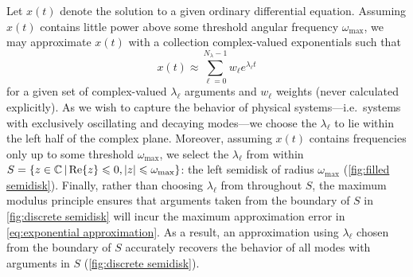 Let $x(t)$ denote the solution to a given ordinary differential equation.
Assuming $x(t)$ contains little power above some threshold angular frequency $\omega_\text{max}$, we may approximate $x(t)$ with a collection complex-valued exponentials such that
\begin{equation}
  x(t) \approx \sum_{\ell = 0}^{N_\lambda - 1} w_\ell e^{\lambda_\ell t}
  \label{eq:exponential approximation}
\end{equation}
for a given set of complex-valued $\lambda_\ell$ arguments and $w_\ell$ weights (never calculated explicitly).
As we wish to capture the behavior of physical systems---i.e.\ systems with exclusively oscillating and decaying modes---we choose the $\lambda_\ell$ to lie within the left half of the complex plane.
Moreover, assuming $x(t)$ contains frequencies only up to some threshold $\omega_\text{max}$, we select the $\lambda_\ell$ from within $S = \qty{z \in \mathbb{C} \, | \Re{z} \leqslant 0, \abs{z} \leqslant \omega_\text{max}}$: the left semidisk of radius $\omega_\text{max}$ (\cref{fig:filled semidisk}).
Finally, rather than choosing $\lambda_\ell$ from throughout $S$, the maximum modulus principle ensures that arguments taken from the boundary of $S$ in \cref{fig:discrete semidisk} will incur the maximum approximation error in \cref{eq:exponential approximation}. 
As a result, an approximation using $\lambda_\ell$ chosen from the boundary of $S$ accurately recovers the behavior of all modes with arguments in $S$ (\cref{fig:discrete semidisk}).


